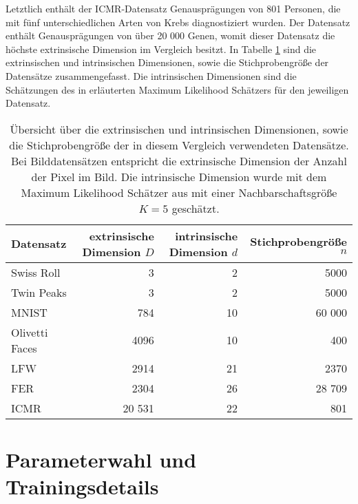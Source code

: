 Letztlich enthält der ICMR-Datensatz Genausprägungen von 801 Personen, die mit fünf
unterschiedlichen Arten von Krebs diagnostiziert wurden. Der Datensatz enthält Genausprägungen von
über 20 000 Genen, womit dieser Datensatz die höchste extrinsische Dimension im Vergleich besitzt.
In Tabelle \ref{tab:uebersicht-datensaetze} sind die extrinsischen und intrinsischen Dimensionen,
sowie die Stichprobengröße der Datensätze zusammengefasst. Die intrinsischen Dimensionen sind die
Schätzungen des in 
erläuterten Maximum Likelihood Schätzers für den jeweiligen Datensatz.

\begin{table}[]
	\centering
	\begin{tabular}{@{}lrrr@{}}
		\toprule
		Datensatz      & extrinsische Dimension $D$ & intrinsische Dimension $d$ & Stichprobengröße $n$ \\ \midrule
		Swiss Roll     & 3                          & 2                          & 5000                 \\
		Twin Peaks     & 3                          & 2                          & 5000                 \\
		MNIST          & 784                        & 10                         & 60 000               \\
		Olivetti Faces & 4096                       & 10                         & 400                  \\
		LFW            & 2914                       & 21                         & 2370                 \\
		FER            & 2304                       & 26                         & 28 709               \\
		ICMR           & 20 531                     & 22                         & 801                  \\
		\bottomrule
	\end{tabular}
	\caption{Übersicht über die extrinsischen und intrinsischen Dimensionen, sowie die Stichprobengröße der in diesem Vergleich verwendeten Datensätze. Bei Bilddatensätzen entspricht die extrinsische Dimension der Anzahl der Pixel im Bild. Die intrinsische Dimension wurde mit dem Maximum Likelihood Schätzer aus  mit einer Nachbarschaftsgröße $K=5$ geschätzt.}
	\label{tab:uebersicht-datensaetze}
\end{table}

\section{Parameterwahl und Trainingsdetails}
\label{ch:Vergleich:sec:ParameterwahlTrainingsdetails}

